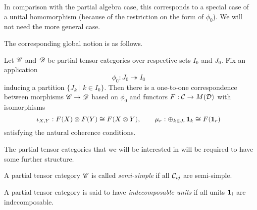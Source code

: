 \begin{Rem} 
In comparison with the partial algebra case, this corresponds to a special case of a unital homomorphism (because of the restriction on the form of $\phi_0$). We will not need the more general case. 
\end{Rem}
The corresponding global notion is as follows.

\begin{Lem} Let $\mathscr{C}$ and $\mathscr{D}$ be partial tensor categories over respective sets $I_0$ and $J_0$. Fix an application \[\phi_0: J_0\twoheadrightarrow I_0\] inducing a partition $\{J_k\mid k\in I_0\}$. Then there is a one-to-one correspondence between morphisms $\mathscr{C}\rightarrow \mathscr{D}$ based on $\phi_0$ and functors $F:\mathcal{C} \rightarrow M(\mathcal{D})$ with isomorphisms \[\iota_{X,Y}:F(X)\otimes F(Y)\cong F(X\otimes Y),\qquad \mu_r:\oplus_{k\in J_r} \mathbf{1}_k \cong F(\mathbf{1}_r)\] satisfying the natural coherence conditions. 
\end{Lem} 

The partial tensor categories that we will be interested in will be required to have some further structure. 


\begin{Def} A partial tensor category $\mathscr{C}$ is called \emph{semi-simple} if all $\mathcal{C}_{ij}$ are semi-simple. 

A partial tensor category is said to have \emph{indecomposable units} if all units $\mathbf{1}_i$ are indecomposable. 
\end{Def}

